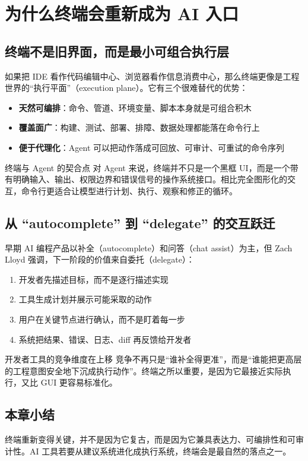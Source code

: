 \section{为什么终端会重新成为 AI 入口}

\subsection{终端不是旧界面，而是最小可组合执行层}

如果把 IDE 看作代码编辑中心、浏览器看作信息消费中心，那么终端更像是工程世界的``执行平面''（execution plane）。它有三个很难替代的优势：

\begin{itemize}
    \item \textbf{天然可编排}：命令、管道、环境变量、脚本本身就是可组合积木
    \item \textbf{覆盖面广}：构建、测试、部署、排障、数据处理都能落在命令行上
    \item \textbf{便于代理化}：Agent 可以把动作落成可回放、可审计、可重试的命令序列
\end{itemize}

\begin{knowledgebox}{终端与 Agent 的契合点}
对 Agent 来说，终端并不只是一个黑框 UI，而是一个带有明确输入、输出、权限边界和错误信号的操作系统接口。相比完全图形化的交互，命令行更适合让模型进行计划、执行、观察和修正的循环。
\end{knowledgebox}

\subsection{从 ``autocomplete'' 到 ``delegate'' 的交互跃迁}

早期 AI 编程产品以补全（autocomplete）和问答（chat assist）为主，但 Zach Lloyd 强调，下一阶段的价值来自委托（delegate）：

\begin{enumerate}
    \item 开发者先描述目标，而不是逐行描述实现
    \item 工具生成计划并展示可能采取的动作
    \item 用户在关键节点进行确认，而不是盯着每一步
    \item 系统把结果、错误、日志、diff 再反馈给开发者
\end{enumerate}

\begin{importantbox}{开发者工具的竞争维度在上移}
竞争不再只是``谁补全得更准''，而是``谁能把更高层的工程意图安全地下沉成执行动作''。终端之所以重要，是因为它最接近实际执行，又比 GUI 更容易标准化。
\end{importantbox}

\subsection{本章小结}

终端重新变得关键，并不是因为它复古，而是因为它兼具表达力、可编排性和可审计性。AI 工具若要从建议系统进化成执行系统，终端会是最自然的落点之一。

